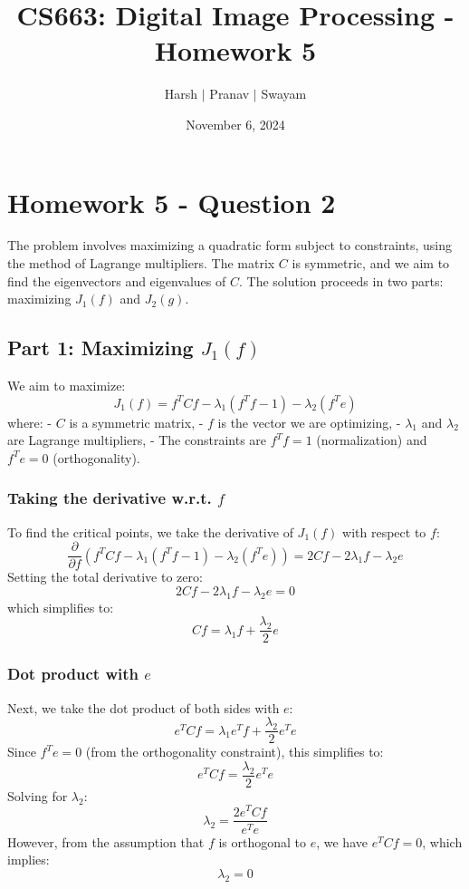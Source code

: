 \documentclass{article}
\title{CS663: Digital Image Processing - Homework 5}
\author{Harsh $\vert$ Pranav $\vert$ Swayam}
\date{November 6, 2024}
\begin{document}
\maketitle
\flushleft
\section*{Homework 5 - Question 2}

The problem involves maximizing a quadratic form subject to constraints, using the method of Lagrange multipliers. The matrix $C$ is symmetric, and we aim to find the eigenvectors and eigenvalues of $C$. The solution proceeds in two parts: maximizing $J_1(f)$ and $J_2(g)$.

\subsection*{Part 1: Maximizing $J_1(f)$}
We aim to maximize:
\[
J_1(f) = f^T C f - \lambda_1 (f^T f - 1) - \lambda_2 (f^T e)
\]
where:
- $C$ is a symmetric matrix,
- $f$ is the vector we are optimizing,
- $\lambda_1$ and $\lambda_2$ are Lagrange multipliers,
- The constraints are $f^T f = 1$ (normalization) and $f^T e = 0$ (orthogonality).

\subsubsection*{Taking the derivative w.r.t. $f$}

To find the critical points, we take the derivative of $J_1(f)$ with respect to $f$:
\[
\frac{\partial}{\partial f} (f^T C f - \lambda_1 (f^T f - 1) - \lambda_2 (f^T e)) = 2 C f - 2 \lambda_1 f - \lambda_2 e 
\]
Setting the total derivative to zero:
\[
2 C f - 2 \lambda_1 f - \lambda_2 e = 0
\]
which simplifies to:
\[
C f = \lambda_1 f + \frac{\lambda_2}{2} e
\]

\subsubsection*{Dot product with $e$}

Next, we take the dot product of both sides with $e$:
\[
e^T C f = \lambda_1 e^T f + \frac{\lambda_2}{2} e^T e
\]
Since $f^T e = 0$ (from the orthogonality constraint), this simplifies to:
\[
e^T C f = \frac{\lambda_2}{2} e^T e
\]
Solving for $\lambda_2$:
\[
\lambda_2 = \frac{2 e^T C f}{e^T e}
\]
However, from the assumption that $f$ is orthogonal to $e$, we have $e^T C f = 0$, which implies:
\[
\lambda_2 = 0
\]
\end{document}
